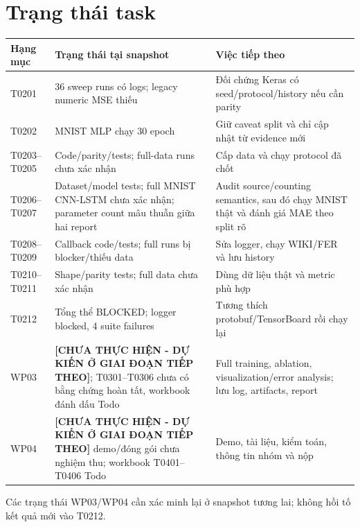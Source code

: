\section{Trạng thái task}
\begin{longtable}{p{}p{}p{}}
\toprule Hạng mục & Trạng thái tại snapshot & Việc tiếp theo \\
\midrule
T0201 & 36 sweep runs có logs; legacy numeric MSE thiếu & Đối chứng Keras có seed/protocol/history nếu cần parity \\
T0202 & MNIST MLP chạy 30 epoch & Giữ caveat split và chỉ cập nhật từ evidence mới \\
T0203--T0205 & Code/parity/tests; full-data runs chưa xác nhận & Cấp data và chạy protocol đã chốt \\
T0206--T0207 & Dataset/model tests; full MNIST CNN-LSTM chưa xác nhận; parameter count mâu thuẫn giữa hai report & Audit source/counting semantics, sau đó chạy MNIST thật và đánh giá MAE theo split rõ \\
T0208--T0209 & Callback code/tests; full runs bị blocker/thiếu data & Sửa logger, chạy WIKI/FER và lưu history \\
T0210--T0211 & Shape/parity tests; full data chưa xác nhận & Dùng dữ liệu thật và metric phù hợp \\
T0212 & Tổng thể BLOCKED; logger blocked, 4 suite failures & Tương thích protobuf/TensorBoard rồi chạy lại \\
WP03 & \textbf{[CHƯA THỰC HIỆN - DỰ KIẾN Ở GIAI ĐOẠN TIẾP THEO]}; T0301--T0306 chưa có bằng chứng hoàn tất, workbook đánh dấu Todo & Full training, ablation, visualization/error analysis; lưu log, artifacts, report \\
WP04 & \textbf{[CHƯA THỰC HIỆN - DỰ KIẾN Ở GIAI ĐOẠN TIẾP THEO]} demo/đóng gói chưa nghiệm thu; workbook T0401--T0406 Todo & Demo, tài liệu, kiểm toán, thông tin nhóm và nộp \\
\bottomrule
\end{longtable}
Các trạng thái WP03/WP04 cần xác minh lại ở snapshot tương lai; không hồi tố kết quả mới vào T0212.